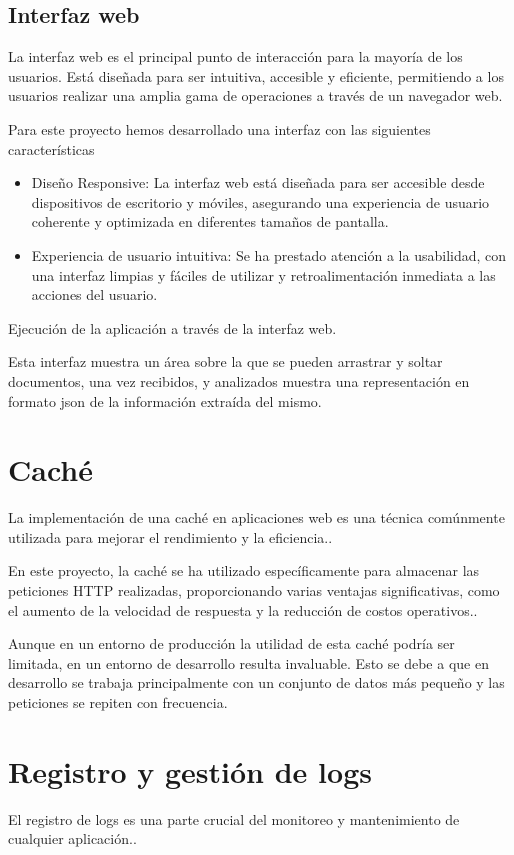 \subsection*{Interfaz web}
La interfaz web es el principal punto de interacción para la mayoría de los usuarios. Está diseñada para ser intuitiva,
accesible y eficiente, permitiendo a los usuarios realizar una amplia gama de operaciones a través de un navegador web.

Para este proyecto hemos desarrollado una interfaz con las siguientes características

\begin{itemize}
    \item
    Diseño Responsive: La interfaz web está diseñada para ser accesible desde dispositivos de escritorio y móviles,
    asegurando una experiencia de usuario coherente y optimizada en diferentes tamaños de pantalla.
    \item
    Experiencia de usuario intuitiva: Se ha prestado atención a la usabilidad, con una interfaz limpias y fáciles de
    utilizar y retroalimentación inmediata a las acciones del usuario.
\end{itemize}


Ejecución de la aplicación a través de la interfaz web.

Esta interfaz muestra un área sobre la que se pueden arrastrar y soltar documentos, una vez recibidos, y analizados
muestra una representación en formato json de la información extraída del mismo.

\section*{Caché}
La implementación de una caché en aplicaciones web es una técnica comúnmente utilizada para mejorar el rendimiento y la
eficiencia..

En este proyecto, la caché se ha utilizado específicamente para almacenar las peticiones HTTP realizadas, proporcionando
varias ventajas significativas, como el aumento de la velocidad de respuesta y la reducción de costos operativos..

Aunque en un entorno de producción la utilidad de esta caché podría ser limitada, en un entorno de desarrollo resulta
invaluable. Esto se debe a que en desarrollo se trabaja principalmente con un conjunto de datos más pequeño y las
peticiones se repiten con frecuencia.

\section*{Registro y gestión de logs}
El registro de logs es una parte crucial del monitoreo y mantenimiento de cualquier aplicación..

